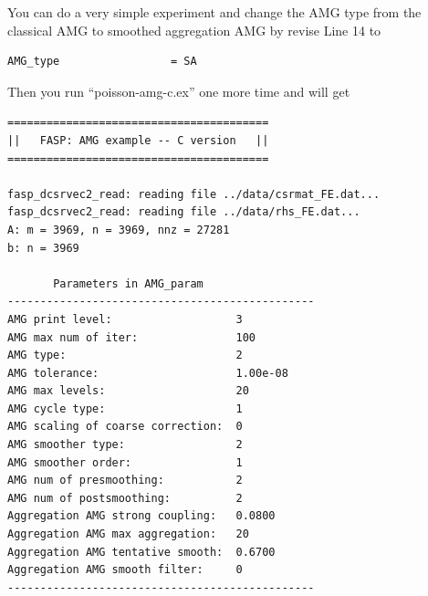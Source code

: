 \documentclass[11pt]{memoir}
\begin{document}
You can do a very simple experiment and change the AMG type from the classical AMG to smoothed aggregation AMG by revise Line 14 to
%
\begin{lstlisting}[numbers=none]
AMG_type                 = SA
\end{lstlisting}
%
Then you run ``poisson-amg-c.ex'' one more time and will get
%
\begin{lstlisting}[numbers=none]
========================================
||   FASP: AMG example -- C version   ||
========================================

fasp_dcsrvec2_read: reading file ../data/csrmat_FE.dat...
fasp_dcsrvec2_read: reading file ../data/rhs_FE.dat...
A: m = 3969, n = 3969, nnz = 27281
b: n = 3969

       Parameters in AMG_param
-----------------------------------------------
AMG print level:                   3
AMG max num of iter:               100
AMG type:                          2
AMG tolerance:                     1.00e-08
AMG max levels:                    20
AMG cycle type:                    1
AMG scaling of coarse correction:  0
AMG smoother type:                 2
AMG smoother order:                1
AMG num of presmoothing:           2
AMG num of postsmoothing:          2
Aggregation AMG strong coupling:   0.0800
Aggregation AMG max aggregation:   20
Aggregation AMG tentative smooth:  0.6700
Aggregation AMG smooth filter:     0
-----------------------------------------------



\end{lstlisting}
\end{document}
